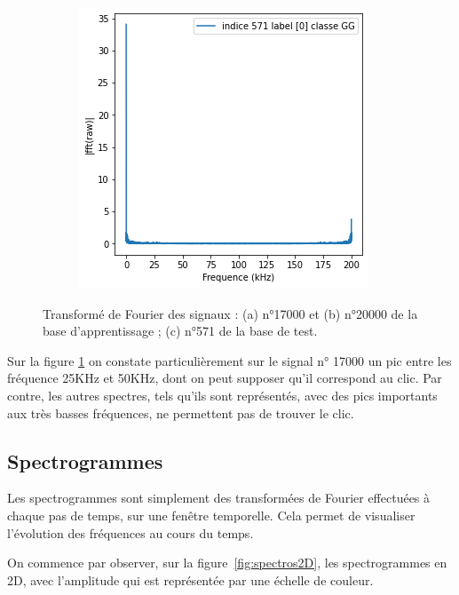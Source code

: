 \begin{figure}[!h]
\begin{subfigure}[b]{0.3\textwidth}
  \end{subfigure}
  \begin{subfigure}[b]{0.3\textwidth}
    \includegraphics[width=\textwidth]{./images/571fft.png}
  \end{subfigure}
  \caption{Transformé de Fourier des signaux : (a) n°17000 et (b) n°20000 de la base d'apprentissage ; (c) n°571 de la base de test.%
\label{fig:tf}}
\end{figure}

Sur la figure \ref{fig:tf} on constate particulièrement sur le signal n° 17000 un pic entre les fréquence 25KHz et 50KHz, dont on peut supposer qu'il correspond au clic.
Par contre, les autres spectres, tels qu'ils sont représentés, avec des pics importants aux très basses fréquences, ne permettent pas de trouver le clic.

\hypertarget{Spectrogrammes}{%
\subsection{Spectrogrammes}
\label{Spectrogrammes}}

Les spectrogrammes sont simplement des transformées de Fourier effectuées à chaque pas de temps, sur une fenêtre temporelle. Cela permet de visualiser l'évolution des fréquences au cours du temps.

On commence par observer, sur la figure~\ref{fig:spectros2D}, les spectrogrammes en 2D, avec l'amplitude qui est représentée par une échelle de couleur.

